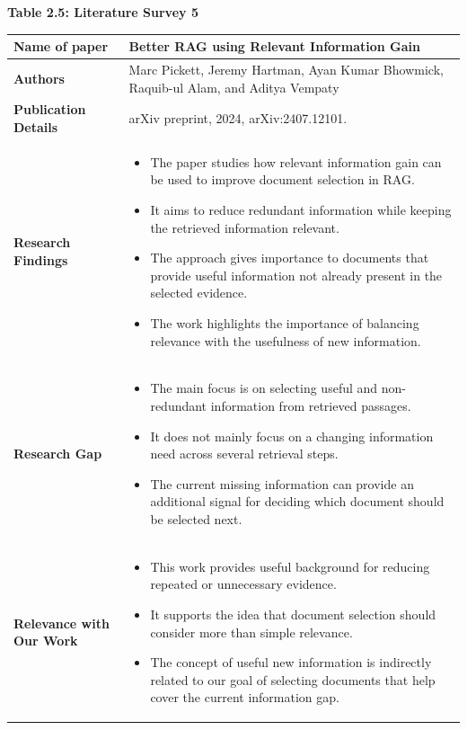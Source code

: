 \documentclass[12pt,a4paper]{report}
\begin{document}
\begin{center}\textbf{Table 2.5: Literature Survey 5}\end{center}
\begin{longtable}{|p{1.25in}|p{5.15in}|}
\hline

\textbf{Name of paper} & Better RAG using Relevant Information Gain \\ \hline

\textbf{Authors} & Marc Pickett, Jeremy Hartman, Ayan Kumar Bhowmick, Raquib-ul Alam, and Aditya Vempaty \\ \hline

\textbf{Publication Details} & arXiv preprint, 2024, arXiv:2407.12101. \\ \hline

\textbf{Research Findings} &
\begin{itemize}[leftmargin=0.18in,itemsep=0.05in,topsep=0pt,parsep=0pt]
\item The paper studies how relevant information gain can be used to improve document selection in RAG.
\item It aims to reduce redundant information while keeping the retrieved information relevant.
\item The approach gives importance to documents that provide useful information not already present in the selected evidence.
\item The work highlights the importance of balancing relevance with the usefulness of new information.
\end{itemize} \\ \hline

\textbf{Research Gap} &
\begin{itemize}[leftmargin=0.18in,itemsep=0.05in,topsep=0pt,parsep=0pt]
\item The main focus is on selecting useful and non-redundant information from retrieved passages.
\item It does not mainly focus on a changing information need across several retrieval steps.
\item The current missing information can provide an additional signal for deciding which document should be selected next.
\end{itemize} \\ \hline

\textbf{Relevance with Our Work} &
\begin{itemize}[leftmargin=0.18in,itemsep=0.05in,topsep=0pt,parsep=0pt]
\item This work provides useful background for reducing repeated or unnecessary evidence.
\item It supports the idea that document selection should consider more than simple relevance.
\item The concept of useful new information is indirectly related to our goal of selecting documents that help cover the current information gap.
\end{itemize} \\ \hline

\end{longtable}
\clearpage
\end{document}
